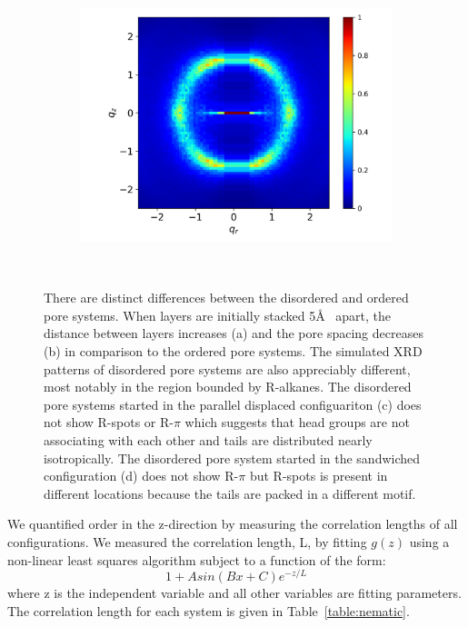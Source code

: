 \documentclass[journal=jpcbfk,manusciprt=article]{achemso}
\begin{document}
\begin{figure}[!hbt]
        \begin{subfigure}{0.45\linewidth}
                \centering
                \includegraphics[width=\linewidth]{layered_disordered_rzplot.png}
                \caption{}~\label{fig:layered_disordered_xrd}
        \end{subfigure}
	\caption{There are distinct differences between the disordered and ordered pore systems. 
		When layers are initially stacked 5\AA~ apart, the distance
		between layers increases (a) and the pore spacing decreases (b) in comparison to
		the ordered pore systems. The simulated
		XRD patterns of disordered pore systems are also appreciably different, most 
		notably in the region bounded by R-alkanes. The disordered pore
		systems started in the parallel displaced configuariton (c) does not show R-spots
		or R-$\pi$ which suggests that head groups are not associating with each other
		and tails are distributed nearly isotropically. The disordered pore system
		started in the sandwiched configuration (d) does not show R-$\pi$ but R-spots 
		is present in different locations because the tails are packed in a different
		motif.}
  \end{figure}


  We quantified order in the z-direction by measuring the correlation lengths
  of all configurations. We measured the correlation length, L, by fitting $g(z)$
  using a non-linear least squares algorithm subject to a function of the form:
  \begin{equation}
  	1 + Asin(Bx + C)e^{-z/L}
        \label{eqn:correlation_fit}
  \end{equation}
  where z is the independent variable and all other variables are fitting
  parameters. The correlation length for each system is given in
  Table~\ref{table:nematic}.
\end{document}
